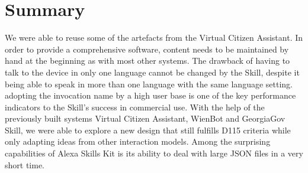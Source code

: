 

%


\section{Summary}


We were able to reuse some of the artefacts from the Virtual Citizen Assistant. In order to provide a comprehensive software, content needs to be maintained by hand at the beginning as with most other systems. The drawback of having to talk to the device in only one language cannot be changed by the Skill, despite it being able to speak in more than one language with the same language setting. %
adopting the invocation name by a high user base is one of the key performance indicators to the Skill's success in commercial use.
With the help of the previously built systems Virtual Citizen Assistant, WienBot and GeorgiaGov Skill, we were able to explore a new design that still fulfills D115 criteria while only adapting ideas from other interaction models. %
Among the surprising capabilities of Alexa Skills Kit is its ability to deal with large JSON files in a very short time.